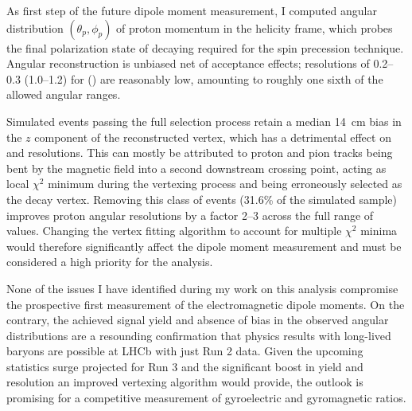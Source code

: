 As first step of the future \lz dipole moment measurement, I computed angular distribution $(\theta_p, \phi_p)$ of proton momentum in the \lz helicity frame, which probes the final polarization state of decaying \lz required for the spin precession technique.
Angular reconstruction is unbiased net of acceptance effects;
resolutions of 0.2--0.3 (1.0--1.2) for \cthetap (\phip) are reasonably low, amounting to roughly one sixth of the allowed angular ranges.

Simulated \demonstratorshort events passing the full selection process retain a median \SI{14}{\centi\meter} bias in the $z$ component of the reconstructed \lambdadecay vertex, which has a detrimental effect on \cthetap and \phip resolutions.
This can mostly be attributed to proton and pion tracks being bent by the magnetic field into a second downstream crossing point, acting as local $\chi^2$ minimum during the vertexing process and being erroneously selected as the \lz decay vertex.
Removing this class of events (31.6\% of the simulated sample) improves proton angular resolutions by a factor 2--3 across the full range of values.
Changing the vertex fitting algorithm to account for multiple $\chi^2$ minima would therefore significantly affect the dipole moment measurement and must be considered a high priority for the analysis.

None of the issues I have identified during my work on this analysis compromise the prospective first measurement of the \lz electromagnetic dipole moments.
On the contrary, the achieved signal yield and absence of bias in the observed angular distributions are a resounding confirmation that physics results with long-lived \lz baryons are possible at LHCb with just Run 2 data.
Given the upcoming statistics surge projected for Run 3 and the significant boost in yield and resolution an improved vertexing algorithm would provide, the outlook is promising for a competitive measurement of \lz gyroelectric and gyromagnetic ratios.